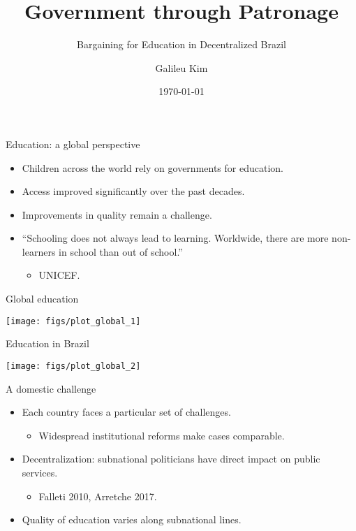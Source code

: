 \documentclass[ignorenonframetext,]{beamer}
\date[]{\today}
\title{Government through Patronage}
\subtitle{Bargaining for Education in Decentralized Brazil}
\author{Galileu Kim}
\institute{Princeton University}
\date{}
\providecommand{\tightlist}{%
  \setlength{\itemsep}{0pt}\setlength{\parskip}{0pt}}
\newcommand{\source}{\footnotesize\textcolor{black!25}}
\begin{document}
\frame{\titlepage}

\begin{frame}{Education: a global perspective}
\protect\hypertarget{education-a-global-perspective}{}

\begin{itemize}
\tightlist
\item
  Children across the world rely on governments for education.
\item
  Access improved significantly over the past decades.
\item
  Improvements in quality remain a challenge.
\item
  ``Schooling does not always lead to learning. Worldwide, there are
  more non-learners in school than out of school.''

  \begin{itemize}
  \item
    \source{UNICEF.}
  \end{itemize}
\end{itemize}

\end{frame}

\begin{frame}{Global education}
\protect\hypertarget{global-education}{}

\begin{center}\texttt{[image: figs/plot\_global\_1]} \end{center}

\end{frame}

\begin{frame}{Education in Brazil}
\protect\hypertarget{education-in-brazil}{}

\begin{center}\texttt{[image: figs/plot\_global\_2]} \end{center}

\end{frame}

\begin{frame}{A domestic challenge}
\protect\hypertarget{a-domestic-challenge}{}

\begin{itemize}
\tightlist
\item
  Each country faces a particular set of challenges.

  \begin{itemize}
  \tightlist
  \item
    Widespread institutional reforms make cases comparable.
  \end{itemize}
\item
  Decentralization: subnational politicians have direct impact on public
  services.

  \begin{itemize}
  \item
    \source{Falleti 2010, Arretche 2017.}
  \end{itemize}
\item
  Quality of education varies along subnational lines.
\end{itemize}

\end{frame}
\end{document}
